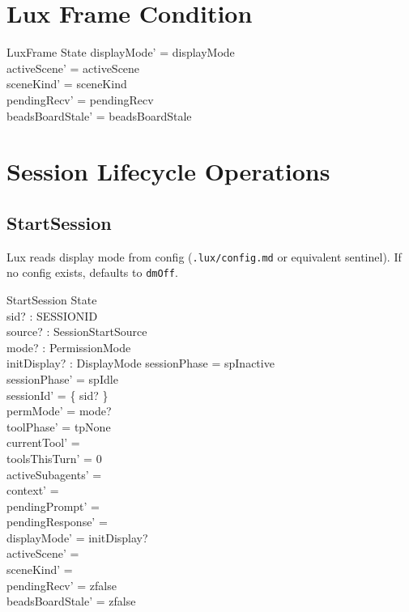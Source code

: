 \documentclass[a4paper,10pt,fleqn]{article}
\begin{document}
\section{Lux Frame Condition}

\begin{schema}{LuxFrame}
  \Delta State
  \where
  displayMode' = displayMode \\
  activeScene' = activeScene \\
  sceneKind' = sceneKind \\
  pendingRecv' = pendingRecv \\
  beadsBoardStale' = beadsBoardStale
\end{schema}

\section{Session Lifecycle Operations}

\subsection{StartSession}

Lux reads display mode from config (\texttt{.lux/config.md} or
equivalent sentinel). If no config exists, defaults to \texttt{dmOff}.

\begin{schema}{StartSession}
  \Delta State \\
  sid? : SESSIONID \\
  source? : SessionStartSource \\
  mode? : PermissionMode \\
  initDisplay? : DisplayMode
  \where
  sessionPhase = spInactive \\
  sessionPhase' = spIdle \\
  sessionId' = \{ sid? \} \\
  permMode' = mode? \\
  toolPhase' = tpNone \\
  currentTool' = \emptyset \\
  toolsThisTurn' = 0 \\
  activeSubagents' = \emptyset \\
  context' = \langle \rangle \\
  pendingPrompt' = \emptyset \\
  pendingResponse' = \emptyset \\
  displayMode' = initDisplay? \\
  activeScene' = \emptyset \\
  sceneKind' = \emptyset \\
  pendingRecv' = zfalse \\
  beadsBoardStale' = zfalse
\end{schema}
\end{document}
